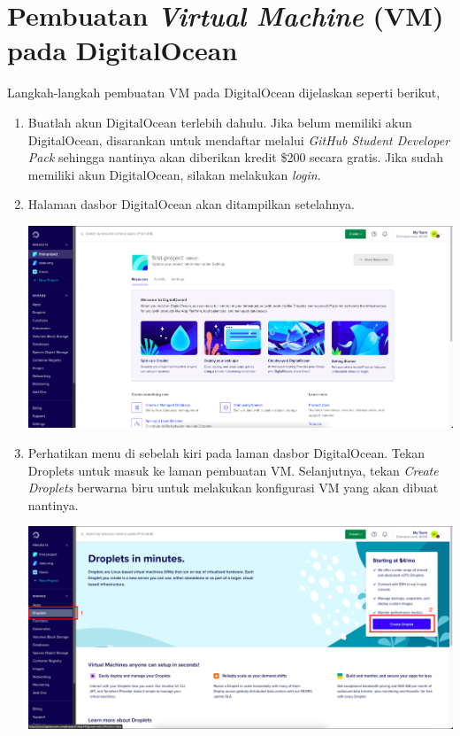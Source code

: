 \chapter{Pembuatan \textit{Virtual Machine} (VM) pada DigitalOcean}
\label{appendix:A}

Langkah-langkah pembuatan VM pada DigitalOcean dijelaskan seperti berikut,
\begin{enumerate}
  \item Buatlah akun DigitalOcean terlebih dahulu. Jika belum memiliki akun DigitalOcean, disarankan untuk mendaftar melalui \textit{GitHub Student Developer Pack} sehingga nantinya akan diberikan kredit \$200 secara gratis. Jika sudah memiliki akun DigitalOcean, silakan melakukan \textit{login}.
  \item Halaman dasbor DigitalOcean akan ditampilkan setelahnya.
	\begin{center}
	\includegraphics[width=1\linewidth]{figures/ch99/ap1/1.png}
	\end{center} 
  \item Perhatikan menu di sebelah kiri pada laman dasbor DigitalOcean. Tekan Droplets untuk masuk ke laman pembuatan VM. Selanjutnya, tekan \textit{Create Droplets} berwarna biru untuk melakukan konfigurasi VM yang akan dibuat nantinya. \pagebreak
	\begin{center}
	\includegraphics[width=1\linewidth]{figures/ch99/ap1/2.png}

\end{center}
\end{enumerate}
